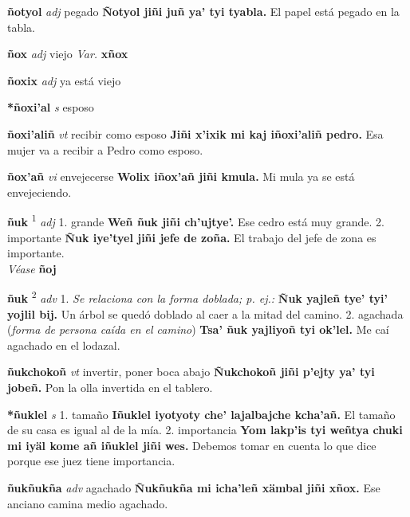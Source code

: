 \documentclass[10pt]{scrbook}
\newcommand{\entry}[1]{\textbf{#1}}
\newcommand{\onedefinition}[1]{#1.}
\newcommand{\defsuperscript}[1]{\textsuperscript{#1}}
\newcommand{\nontranslationdef}[1]{\textit{#1}}
\newcommand{\partofspeech}[1]{\textit{#1}}
\newcommand{\spanishtranslation}[1]{#1}
\newcommand{\clarification}[1]{(\textit{#1})}
\newcommand{\cholexample}[1]{\textbf{#1}}
\newcommand{\exampletranslation}[1]{#1}
\newcommand{\alsosee}[1]{\\\textit{Véase} \textbf{#1}}
\newcommand{\variation}[1]{\textit{Var.} \textbf{#1}}
\begin{document}
\begin{multicols}{2}
\entry{ñotyol}
\partofspeech{adj}
\spanishtranslation{pegado}
\cholexample{Ñotyol jiñi juñ ya' tyi tyabla.}
\exampletranslation{El papel está pegado en la tabla.}

\entry{ñox}
\partofspeech{adj}
\spanishtranslation{viejo}
\variation{xñox}

\entry{ñoxix}
\partofspeech{adj}
\spanishtranslation{ya está viejo}

\entry{*ñoxi'al}
\partofspeech{s}
\spanishtranslation{esposo}

\entry{ñoxi'aliñ}
\partofspeech{vt}
\spanishtranslation{recibir como esposo}
\cholexample{Jiñi x'ixik mi kaj iñoxi'aliñ pedro.}
\exampletranslation{Esa mujer va a recibir a Pedro como esposo.}

\entry{ñox'añ}
\partofspeech{vi}
\spanishtranslation{envejecerse}
\cholexample{Wolix iñox'añ jiñi kmula.}
\exampletranslation{Mi mula ya se está envejeciendo.}

\entry{ñuk}
\defsuperscript{1}
\partofspeech{adj}
\onedefinition{1}
\spanishtranslation{grande}
\cholexample{Weñ ñuk jiñi ch'ujtye'.}
\exampletranslation{Ese cedro está muy grande.}
\onedefinition{2}
\spanishtranslation{importante}
\cholexample{Ñuk iye'tyel jiñi jefe de zoña.}
\exampletranslation{El trabajo del jefe de zona es importante.}
\alsosee{ñoj}

\entry{ñuk}
\defsuperscript{2}
\partofspeech{adv}
\onedefinition{1}
\nontranslationdef{Se relaciona con la forma doblada; p. ej.:}
\cholexample{Ñuk yajleñ tye' tyi' yojlil bij.}
\exampletranslation{Un árbol se quedó doblado al caer a la mitad del camino.}
\onedefinition{2}
\spanishtranslation{agachada}
\clarification{forma de persona caída en el camino}
\cholexample{Tsa' ñuk yajliyoñ tyi ok'lel.}
\exampletranslation{Me caí agachado en el lodazal.}

\entry{ñukchokoñ}
\partofspeech{vt}
\spanishtranslation{invertir, poner boca abajo}
\cholexample{Ñukchokoñ jiñi p'ejty ya' tyi jobeñ.}
\exampletranslation{Pon la olla invertida en el tablero.}

\entry{*ñuklel}
\partofspeech{s}
\onedefinition{1}
\spanishtranslation{tamaño}
\cholexample{Iñuklel iyotyoty che' lajalbajche kcha'añ.}
\exampletranslation{El tamaño de su casa es igual al de la mía.}
\onedefinition{2}
\spanishtranslation{importancia}
\cholexample{Yom lakp'is tyi weñtya chuki mi iyäl kome añ iñuklel jiñi wes.}
\exampletranslation{Debemos tomar en cuenta lo que dice porque ese juez tiene importancia.}

\entry{ñukñukña}
\partofspeech{adv}
\spanishtranslation{agachado}
\cholexample{Ñukñukña mi icha'leñ xämbal jiñi xñox.}
\exampletranslation{Ese anciano camina medio agachado.}


\end{multicols}
\end{document}
